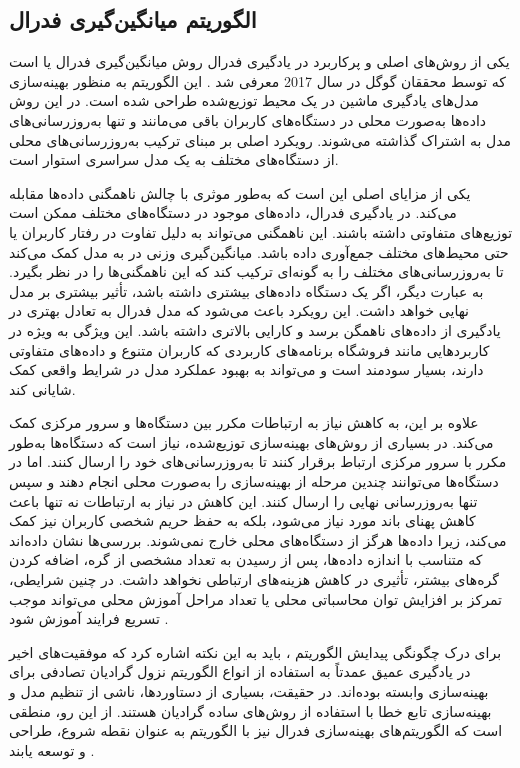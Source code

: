 \subsection{
	الگوریتم میانگین‌گیری فدرال%
}
یکی از روش‌های اصلی و پرکاربرد در یادگیری فدرال روش میانگین‌گیری فدرال یا
است که توسط محققان گوگل در سال 2017 معرفی شد
\cite{mcmahan2017communication}.
این الگوریتم به منظور بهینه‌سازی مدل‌های یادگیری ماشین در یک محیط توزیع‌شده طراحی شده است. در این روش داده‌ها به‌صورت محلی در دستگاه‌های کاربران باقی می‌مانند و تنها به‌روزرسانی‌های مدل به اشتراک گذاشته می‌شوند. رویکرد اصلی
بر مبنای ترکیب به‌روزرسانی‌های محلی از دستگاه‌های مختلف به یک مدل سراسری استوار است.


یکی از مزایای اصلی
این است که به‌طور موثری با چالش ناهمگنی داده‌ها مقابله می‌کند. در یادگیری فدرال، داده‌های موجود در دستگاه‌های مختلف ممکن است توزیع‌های متفاوتی داشته باشند. این ناهمگنی می‌تواند به دلیل تفاوت در رفتار کاربران یا حتی محیط‌های مختلف جمع‌آوری داده باشد. میانگین‌گیری وزنی در
به مدل کمک می‌کند تا به‌روزرسانی‌های مختلف را به گونه‌ای ترکیب کند که این ناهمگنی‌ها را در نظر بگیرد. به عبارت دیگر، اگر یک دستگاه داده‌های بیشتری داشته باشد، تأثیر بیشتری بر مدل نهایی خواهد داشت. این رویکرد باعث می‌شود که مدل فدرال به تعادل بهتری در یادگیری از داده‌های ناهمگن برسد و کارایی بالاتری داشته باشد. این ویژگی به ویژه در کاربردهایی مانند فروشگاه برنامه‌های کاربردی که کاربران متنوع و داده‌های متفاوتی دارند، بسیار سودمند است و می‌تواند به بهبود عملکرد مدل در شرایط واقعی کمک شایانی کند.

علاوه بر این،
به کاهش نیاز به ارتباطات مکرر بین دستگاه‌ها و سرور مرکزی کمک می‌کند. در بسیاری از روش‌های بهینه‌سازی توزیع‌شده، نیاز است که دستگاه‌ها به‌طور مکرر با سرور مرکزی ارتباط برقرار کنند تا به‌روزرسانی‌های خود را ارسال کنند. اما در
دستگاه‌ها می‌توانند چندین مرحله از بهینه‌سازی را به‌صورت محلی انجام دهند و سپس تنها به‌روزرسانی نهایی را ارسال کنند. این کاهش در نیاز به ارتباطات نه تنها باعث کاهش پهنای باند مورد نیاز می‌شود، بلکه به حفظ حریم شخصی کاربران نیز کمک می‌کند، زیرا داده‌ها هرگز از دستگاه‌های محلی خارج نمی‌شوند. بررسی‌ها نشان داده‌اند که متناسب با اندازه داده‌ها، پس از رسیدن به تعداد مشخصی از گره، اضافه کردن گره‌های بیشتر، تأثیری در کاهش هزینه‌های ارتباطی نخواهد داشت. در چنین شرایطی، تمرکز بر افزایش توان محاسباتی محلی یا تعداد مراحل آموزش محلی می‌تواند موجب تسریع فرایند آموزش شود
\cite{mcmahan2017communication}.

برای درک چگونگی پیدایش الگوریتم
%
، باید به این نکته اشاره کرد که موفقیت‌های اخیر در یادگیری عمیق عمدتاً به استفاده از انواع الگوریتم نزول گرادیان تصادفی%
برای بهینه‌سازی وابسته بوده‌اند. در حقیقت، بسیاری از دستاوردها، ناشی از تنظیم مدل و بهینه‌سازی تابع خطا با استفاده از روش‌های ساده گرادیان هستند. از این رو، منطقی است که الگوریتم‌های بهینه‌سازی فدرال نیز با الگوریتم
به عنوان نقطه شروع، طراحی و توسعه یابند
\cite{mcmahan2017communication}.


